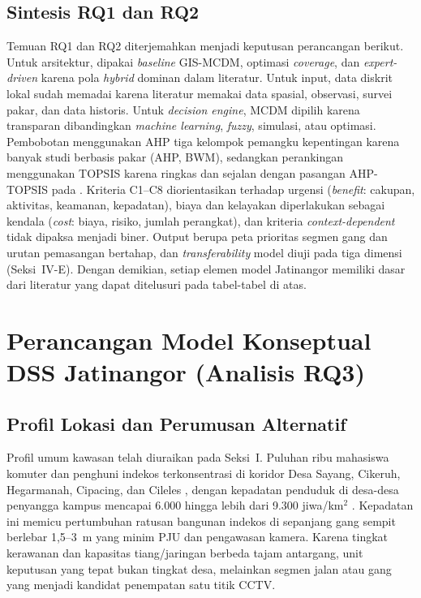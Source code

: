 \documentclass[10pt,twocolumn,a4paper]{article}
\begin{document}
\subsection{Sintesis RQ1 dan RQ2}
Temuan RQ1 dan RQ2 diterjemahkan menjadi keputusan perancangan berikut. Untuk arsitektur, dipakai \textit{baseline} GIS-MCDM, optimasi \textit{coverage}, dan \textit{expert-driven} karena pola \textit{hybrid} dominan dalam literatur. Untuk input, data diskrit lokal sudah memadai karena literatur memakai data spasial, observasi, survei pakar, dan data historis. Untuk \textit{decision engine}, MCDM dipilih karena transparan dibandingkan \textit{machine learning}, \textit{fuzzy}, simulasi, atau optimasi. Pembobotan menggunakan AHP tiga kelompok pemangku kepentingan karena banyak studi berbasis pakar (AHP, BWM), sedangkan perankingan menggunakan TOPSIS karena ringkas dan sejalan dengan pasangan AHP-TOPSIS pada \cite{kanj}. Kriteria C1--C8 diorientasikan terhadap urgensi (\textit{benefit}: cakupan, aktivitas, keamanan, kepadatan), biaya dan kelayakan diperlakukan sebagai kendala (\textit{cost}: biaya, risiko, jumlah perangkat), dan kriteria \textit{context-dependent} tidak dipaksa menjadi biner. Output berupa peta prioritas segmen gang dan urutan pemasangan bertahap, dan \textit{transferability} model diuji pada tiga dimensi (Seksi~IV-E). Dengan demikian, setiap elemen model Jatinangor memiliki dasar dari literatur yang dapat ditelusuri pada tabel-tabel di atas.

\section{Perancangan Model Konseptual DSS Jatinangor (Analisis RQ3)}
\subsection{Profil Lokasi dan Perumusan Alternatif}
Profil umum kawasan telah diuraikan pada Seksi~I. Puluhan ribu mahasiswa komuter dan penghuni indekos terkonsentrasi di koridor Desa Sayang, Cikeruh, Hegarmanah, Cipacing, dan Cileles \cite{bps}, dengan kepadatan penduduk di desa-desa penyangga kampus mencapai 6.000 hingga lebih dari 9.300 jiwa/km$^2$ \cite{bps}. Kepadatan ini memicu pertumbuhan ratusan bangunan indekos di sepanjang gang sempit berlebar 1,5--3~m yang minim PJU dan pengawasan kamera. Karena tingkat kerawanan dan kapasitas tiang/jaringan berbeda tajam antargang, unit keputusan yang tepat bukan tingkat desa, melainkan segmen jalan atau gang yang menjadi kandidat penempatan satu titik CCTV.
\end{document}
